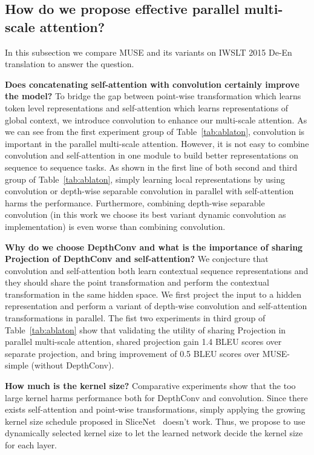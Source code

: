 \documentclass{article} %
\begin{document}
\subsection{How do we propose effective parallel multi-scale attention?}
In this subsection we compare MUSE and its variants on  IWSLT 2015 De-En translation  to answer the question.
 
\textbf{Does concatenating self-attention with convolution certainly improve the model?}
To bridge the gap between point-wise transformation which learns token level representations and self-attention which learns representations of global context, we introduce convolution to enhance our multi-scale attention. As we can see from the  first experiment group of Table~\ref{tab:ablaton},   convolution is important in the parallel multi-scale attention. 
However, it is not easy to combine convolution and self-attention in one module to build better representations on sequence to sequence tasks. As  shown in the first line of both second and third group of Table~\ref{tab:ablaton}, simply learning local representations by using convolution or depth-wise separable convolution in parallel with self-attention  harms the performance. Furthermore, combining depth-wise separable convolution (in this work we choose its best variant dynamic convolution as implementation) is even worse than  combining convolution.

\textbf{Why do we choose DepthConv and what is the importance of sharing Projection of DepthConv and self-attention?}
We conjecture that convolution and self-attention both learn contextual sequence representations and they should share the point  transformation and perform the contextual transformation in the same hidden space. 
We first project  the input to a hidden representation  and perform a variant of  depth-wise convolution and self-attention transformations in parallel.  
The fist two experiments in third group of Table~\ref{tab:ablaton} show that  validating the utility of sharing Projection in parallel multi-scale attention, shared projection gain 1.4 BLEU scores over separate projection, and bring improvement of 0.5 BLEU scores over MUSE-simple (without DepthConv).

\textbf{How much is the kernel size?}
Comparative experiments show that the too large kernel harms performance  both for DepthConv and convolution. Since there exists self-attention and point-wise transformations, simply applying the growing kernel size schedule proposed in SliceNet~\citep{kaiser2017depthwise}  doesn't  work. Thus, we propose to use dynamically selected kernel size to let the learned network decide the kernel size for each layer.
\end{document}
